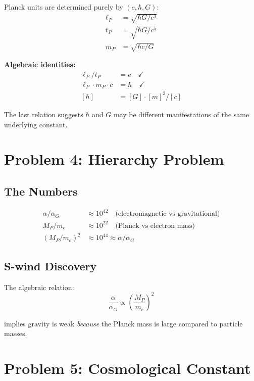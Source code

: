 \documentclass[twocolumn,prl,aps,superscriptaddress]{revtex4-2}
\begin{document}
Planck units are determined purely by $(c, \hbar, G)$:
\begin{align}
\ell_P &= \sqrt{\hbar G/c^3} \\
t_P &= \sqrt{\hbar G/c^5} \\
m_P &= \sqrt{\hbar c/G}
\end{align}

\textbf{Algebraic identities:}
\begin{align}
\ell_P / t_P &= c \quad \checkmark \\
\ell_P \cdot m_P \cdot c &= \hbar \quad \checkmark \\
[\hbar] &= [G] \cdot [m]^2 / [c]
\end{align}

The last relation suggests $\hbar$ and $G$ may be different manifestations 
of the same underlying constant.

\section{Problem 4: Hierarchy Problem}

\subsection{The Numbers}

\begin{align}
\alpha/\alpha_G &\approx 10^{42} \quad \text{(electromagnetic vs gravitational)} \\
M_P/m_e &\approx 10^{22} \quad \text{(Planck vs electron mass)} \\
(M_P/m_e)^2 &\approx 10^{44} \approx \alpha/\alpha_G
\end{align}

\subsection{S-wind Discovery}

The algebraic relation:
\begin{equation}
\frac{\alpha}{\alpha_G} \propto \left(\frac{M_P}{m_e}\right)^2
\end{equation}

implies gravity is weak \emph{because} the Planck mass is large compared to 
particle masses.

\section{Problem 5: Cosmological Constant}
\end{document}
